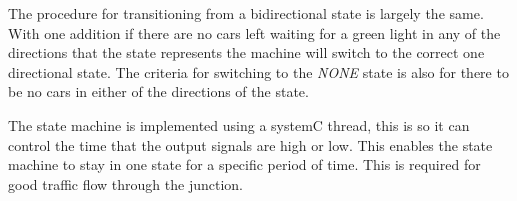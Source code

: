 The procedure for transitioning from a bidirectional state is largely the same. With one addition if there are no cars left waiting for a green light in any of the directions that the state represents the machine will switch to the correct one directional state. The criteria for switching to the \emph{NONE} state is also for there to be no cars in either of the directions of the state.

The state machine is implemented using a systemC thread, this is so it can control the time that the output signals are high or low. This enables the state machine to stay in one state for a specific period of time. This is required for good traffic flow through the junction.
